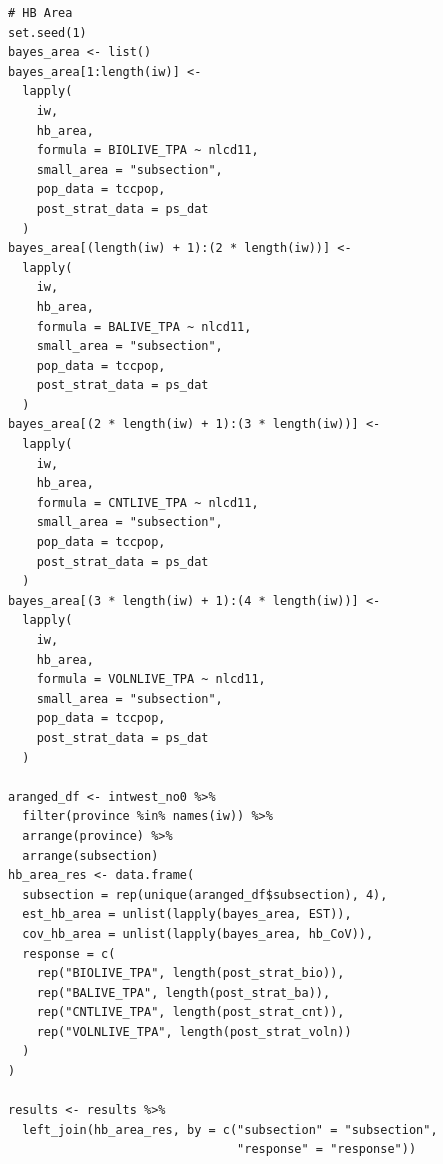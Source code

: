 \documentclass[12pt,twoside]{reedthesis}
\begin{document}
\begin{verbatim}
# HB Area
set.seed(1)
bayes_area <- list()
bayes_area[1:length(iw)] <-
  lapply(
    iw,
    hb_area,
    formula = BIOLIVE_TPA ~ nlcd11,
    small_area = "subsection",
    pop_data = tccpop,
    post_strat_data = ps_dat
  )
bayes_area[(length(iw) + 1):(2 * length(iw))] <-
  lapply(
    iw,
    hb_area,
    formula = BALIVE_TPA ~ nlcd11,
    small_area = "subsection",
    pop_data = tccpop,
    post_strat_data = ps_dat
  )
bayes_area[(2 * length(iw) + 1):(3 * length(iw))] <-
  lapply(
    iw,
    hb_area,
    formula = CNTLIVE_TPA ~ nlcd11,
    small_area = "subsection",
    pop_data = tccpop,
    post_strat_data = ps_dat
  )
bayes_area[(3 * length(iw) + 1):(4 * length(iw))] <-
  lapply(
    iw,
    hb_area,
    formula = VOLNLIVE_TPA ~ nlcd11,
    small_area = "subsection",
    pop_data = tccpop,
    post_strat_data = ps_dat
  )

aranged_df <- intwest_no0 %>%
  filter(province %in% names(iw)) %>%
  arrange(province) %>%
  arrange(subsection)
hb_area_res <- data.frame(
  subsection = rep(unique(aranged_df$subsection), 4),
  est_hb_area = unlist(lapply(bayes_area, EST)),
  cov_hb_area = unlist(lapply(bayes_area, hb_CoV)),
  response = c(
    rep("BIOLIVE_TPA", length(post_strat_bio)),
    rep("BALIVE_TPA", length(post_strat_ba)),
    rep("CNTLIVE_TPA", length(post_strat_cnt)),
    rep("VOLNLIVE_TPA", length(post_strat_voln))
  )
)

results <- results %>%
  left_join(hb_area_res, by = c("subsection" = "subsection",
                                "response" = "response"))
\end{verbatim}
\end{document}
